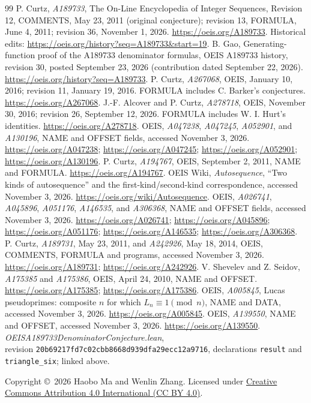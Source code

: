 \documentclass[11pt]{article}
\begin{document}
\begin{thebibliography}{99}
P. Curtz, \emph{A189733}, The On-Line Encyclopedia of Integer Sequences,
Revision 12, COMMENTS, May 23, 2011 (original conjecture);
revision 13, FORMULA, June 4, 2011; revision 36, November 1, 2026.
\url{https://oeis.org/A189733}.
Historical edits: \url{https://oeis.org/history?seq=A189733&start=19}.
B. Gao, Generating-function proof of the A189733 denominator formulas,
OEIS A189733 history, revision 30, posted September 23, 2026
(contribution dated September 22, 2026).
\url{https://oeis.org/history?seq=A189733}.
P. Curtz, \emph{A267068}, OEIS, January 10, 2016; revision 11,
January 19, 2016. FORMULA includes C. Barker's conjectures.
\url{https://oeis.org/A267068}.
J.-F. Alcover and P. Curtz, \emph{A278718}, OEIS, November 30, 2016;
revision 26, September 12, 2026. FORMULA includes W. I. Hurt's identities.
\url{https://oeis.org/A278718}.
OEIS, \emph{A047238}, \emph{A047245}, \emph{A052901}, and \emph{A130196},
NAME and OFFSET fields, accessed November 3, 2026.
\url{https://oeis.org/A047238}; \url{https://oeis.org/A047245};
\url{https://oeis.org/A052901}; \url{https://oeis.org/A130196}.
P. Curtz, \emph{A194767}, OEIS, September 2, 2011, NAME and FORMULA.
\url{https://oeis.org/A194767}.
OEIS Wiki, \emph{Autosequence}, ``Two kinds of autosequence'' and the
first-kind/second-kind correspondence, accessed November 3, 2026.
\url{https://oeis.org/wiki/Autosequence}.
OEIS, \emph{A026741}, \emph{A045896}, \emph{A051176}, \emph{A146535},
and \emph{A306368}, NAME and OFFSET fields, accessed November 3, 2026.
\url{https://oeis.org/A026741}; \url{https://oeis.org/A045896};
\url{https://oeis.org/A051176}; \url{https://oeis.org/A146535};
\url{https://oeis.org/A306368}.
P. Curtz, \emph{A189731}, May 23, 2011, and \emph{A242926}, May 18, 2014,
OEIS, COMMENTS, FORMULA and programs, accessed November 3, 2026.
\url{https://oeis.org/A189731}; \url{https://oeis.org/A242926}.
V. Shevelev and Z. Seidov, \emph{A175385} and \emph{A175386}, OEIS,
April 24, 2010, NAME and OFFSET.
\url{https://oeis.org/A175385}; \url{https://oeis.org/A175386}.
OEIS, \emph{A005845}, Lucas pseudoprimes: composite $n$ for which
$L_n\equiv1\pmod n$, NAME and DATA, accessed November 3, 2026.
\url{https://oeis.org/A005845}.
OEIS, \emph{A139550}, NAME and OFFSET, accessed November 3, 2026.
\url{https://oeis.org/A139550}.
\emph{OEISA189733DenominatorConjecture.lean},\\
revision \texttt{20b69217fd7c02cbb8668d939dfa29ecc12a9716},
declarations \texttt{result} and \texttt{triangle\_six}; linked above.
\end{thebibliography}
\medskip
\noindent\small Copyright \copyright\ 2026 Haobo Ma and Wenlin Zhang.
Licensed under \href{https://creativecommons.org/licenses/by/4.0/}{Creative Commons Attribution 4.0 International (CC BY 4.0)}.
\end{document}
